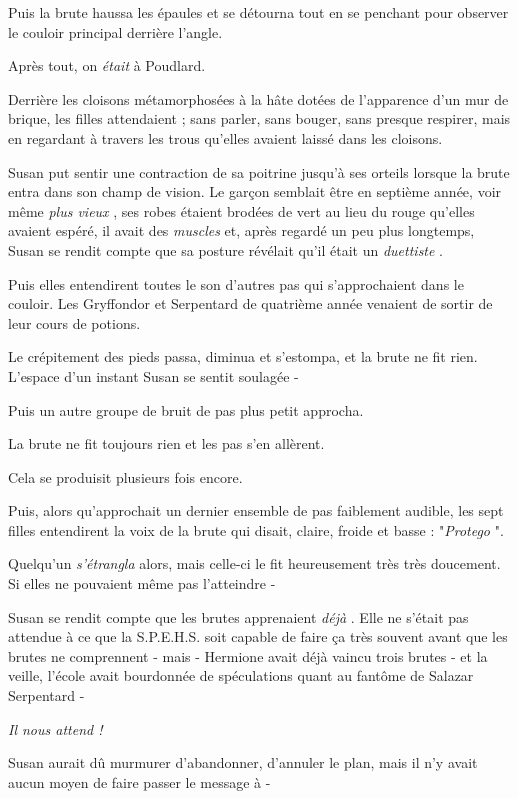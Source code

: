 Puis la brute haussa les épaules et se détourna tout en se penchant pour observer le couloir principal derrière l'angle.

Après tout, on \emph{était}  à Poudlard.

Derrière les cloisons métamorphosées à la hâte dotées de l'apparence d'un mur de brique, les filles attendaient ; sans parler, sans bouger, sans presque respirer, mais en regardant à travers les trous qu'elles avaient laissé dans les cloisons.

Susan put sentir une contraction de sa poitrine jusqu'à ses orteils lorsque la brute entra dans son champ de vision. Le garçon semblait être en septième année, voir même \emph{plus vieux} , ses robes étaient brodées de vert au lieu du rouge qu'elles avaient espéré, il avait des \emph{muscles } et, après regardé un peu plus longtemps, Susan se rendit compte que sa posture révélait qu'il était un \emph{duettiste} .

Puis elles entendirent toutes le son d'autres pas qui s'approchaient dans le couloir. Les Gryffondor et Serpentard de quatrième année venaient de sortir de leur cours de potions.

Le crépitement des pieds passa, diminua et s'estompa, et la brute ne fit rien. L'espace d'un instant Susan se sentit soulagée -

Puis un autre groupe de bruit de pas plus petit approcha.

La brute ne fit toujours rien et les pas s'en allèrent.

Cela se produisit plusieurs fois encore.

Puis, alors qu'approchait un dernier ensemble de pas faiblement audible, les sept filles entendirent la voix de la brute qui disait, claire, froide et basse : "\emph{Protego} ".

Quelqu'un \emph{s'étrangla}  alors, mais celle-ci le fit heureusement très très doucement. Si elles ne pouvaient même pas l'atteindre -

Susan se rendit compte que les brutes apprenaient \emph{déjà} . Elle ne s'était pas attendue à ce que la S.P.E.H.S. soit capable de faire ça très souvent avant que les brutes ne comprennent - mais - Hermione avait déjà vaincu trois brutes - et la veille, l'école avait bourdonnée de spéculations quant au fantôme de Salazar Serpentard -

\emph{Il nous attend !} 

Susan aurait dû murmurer d'abandonner, d'annuler le plan, mais il n'y avait aucun moyen de faire passer le message à -

